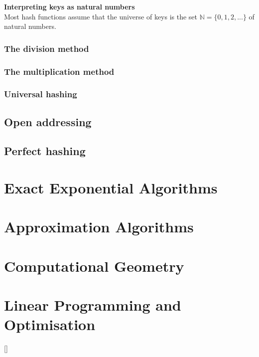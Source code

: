 \documentclass[12pt]{article}
\begin{document}
\textbf{Interpreting keys as natural numbers}\\
Most hash functions assume that the universe of keys is the set $\mathbb{N} = \{0, 1, 2, ...\}$ of natural numbers. 

\subsubsection{The division method}
\subsubsection{The multiplication method}
\subsubsection{Universal hashing}
\subsection{Open addressing}
\subsection{Perfect hashing}
\newpage

\section{Exact Exponential Algorithms}
\newpage

\section{Approximation Algorithms}
\newpage

\section{Computational Geometry}
\newpage

\section{Linear Programming and Optimisation}
[\cite{monoids}]

\newpage

%



\end{document}
